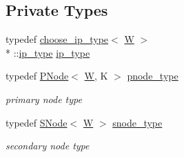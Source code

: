 \subsection*{Private Types}
\begin{DoxyCompactItemize}
\item 
typedef \hyperlink{types_8h_structchoose__ip__type}{choose\-\_\-ip\-\_\-type}$<$ \hyperlink{test__u128_8cpp_ab21b528bc38899d04d3a7053e52fb797}{W} $>$\\*
\-::\hyperlink{classRMPTree_a3dc76d54f334071d8a2bac2422db0159}{ip\-\_\-type} \hyperlink{classRMPTree_a3dc76d54f334071d8a2bac2422db0159}{ip\-\_\-type}
\item 
typedef \hyperlink{structPNode}{P\-Node}$<$ \hyperlink{test__u128_8cpp_ab21b528bc38899d04d3a7053e52fb797}{W}, K $>$ \hyperlink{classRMPTree_ac37da419a61106e5996632fc83670959}{pnode\-\_\-type}
\begin{DoxyCompactList}\small\item\em primary node type \end{DoxyCompactList}\item 
typedef \hyperlink{structSNode}{S\-Node}$<$ \hyperlink{test__u128_8cpp_ab21b528bc38899d04d3a7053e52fb797}{W} $>$ \hyperlink{classRMPTree_ade23f0b765f589613fe10d6cbab738e2}{snode\-\_\-type}
\begin{DoxyCompactList}\small\item\em secondary node type \end{DoxyCompactList}\end{DoxyCompactItemize}
